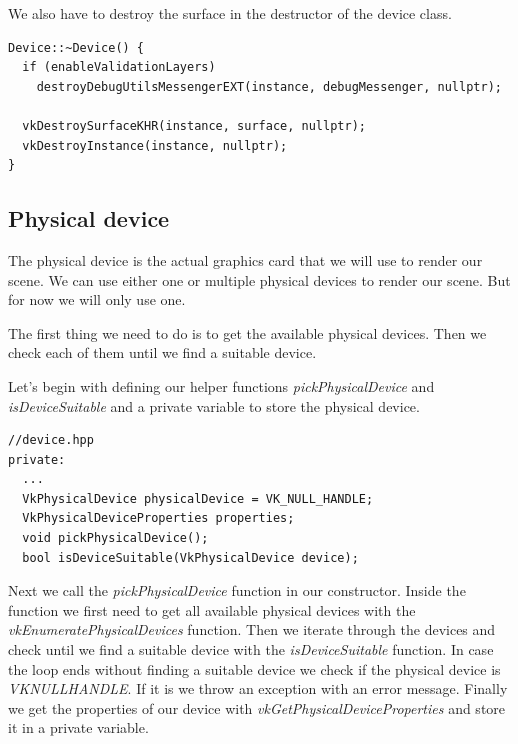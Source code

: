 \documentclass[12pt]{report} \usepackage{preamble}
\begin{document}
We also have to destroy the surface in the destructor of the device class.

\begin{lstlisting}[Language=C++]
Device::~Device() {
  if (enableValidationLayers)
    destroyDebugUtilsMessengerEXT(instance, debugMessenger, nullptr);

  vkDestroySurfaceKHR(instance, surface, nullptr);
  vkDestroyInstance(instance, nullptr);
}
\end{lstlisting}

\subsection{Physical device}

The physical device is the actual graphics card that we will use to render our scene. We
can use either one or multiple physical devices to render our scene. But for now we will
only use one.

The first thing we need to do is to get the available physical devices. Then we check each of them
until we find a suitable device.

Let's begin with defining our helper functions \textit{pickPhysicalDevice} and \textit{isDeviceSuitable}
and a private variable to store the physical device.

\begin{lstlisting}[Language=C++]
//device.hpp
private:
  ...
  VkPhysicalDevice physicalDevice = VK_NULL_HANDLE;
  VkPhysicalDeviceProperties properties;
  void pickPhysicalDevice();
  bool isDeviceSuitable(VkPhysicalDevice device);
\end{lstlisting}

Next we call the \textit{pickPhysicalDevice} function in our constructor. Inside the function we
first need to get all available physical devices with the \textit{vkEnumeratePhysicalDevices} function.
Then we iterate through the devices and check until we find a suitable device with the \textit{isDeviceSuitable}
function. In case the loop ends without finding a suitable device we check if the physical device is
\textit{VK\textunderscore NULL\textunderscore HANDLE}. If it is we throw an exception with an error message.
Finally we get the properties of our device with \textit{vkGetPhysicalDeviceProperties} and store it in a private variable.
\end{document}
